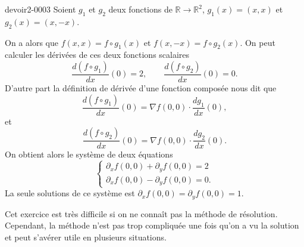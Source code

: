 \begin{corrige}{devoir2-0003}
  Soient $g_1$ et $g_2$ deux fonctions de $\mathbb{R} \to \mathbb{R}^2$, $g_1(x)=(x,x) $ et $g_2(x)= (x, -x)$. 

On a alors que $f(x, x)= f\circ g_1 (x)$ et $f(x,-x)= f\circ g_2(x)$. On peut calculer les dérivées de ces deux fonctions scalaires  
\[\frac{d (f\circ g_1 )}{dx} (0)=2, \qquad \frac{d (f\circ g_2 )}{dx} (0)=0.\]
D'autre part la définition de dérivée d'une fonction composée nous dit que 
\[\frac{d (f\circ g_1 )}{dx} (0)= \nabla f (0,0)\cdot \frac{d g_1 }{dx} (0),\]
et 
\[\frac{d (f\circ g_2)}{dx} (0)= \nabla f (0,0)\cdot \frac{d g_2 }{dx} (0).\]
On obtient alors le système de deux équations 
\begin{equation}
  \begin{cases}
    \partial_x f (0,0) + \partial_y f(0,0)=2\\
    \partial_x f (0,0) - \partial_y f(0,0)=0.
  \end{cases}
\end{equation}
La seule solutions de ce système est $\partial_x f (0,0) =\partial_y f (0,0)=1 $.

Cet exercice est très difficile si on ne connaît pas la méthode de résolution. Cependant, la méthode n'est pas trop compliquée une fois qu'on a vu la solution et peut s'avérer utile en plusieurs situations. 
\end{corrige}
